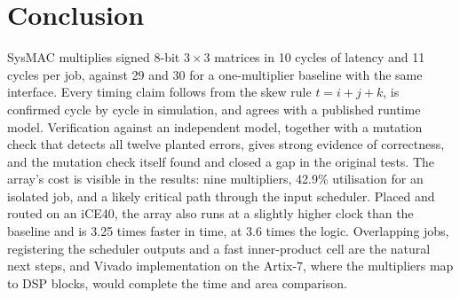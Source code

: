 \documentclass[conference]{IEEEtran}
\begin{document}
\section{Conclusion}
\label{sec:conc}
SysMAC multiplies signed 8-bit $3 \times 3$ matrices in 10 cycles of latency and 11 cycles per job, against 29 and 30 for a one-multiplier baseline with the same interface. Every timing claim follows from the skew rule $t = i + j + k$, is confirmed cycle by cycle in simulation, and agrees with a published runtime model. Verification against an independent model, together with a mutation check that detects all twelve planted errors, gives strong evidence of correctness, and the mutation check itself found and closed a gap in the original tests. The array's cost is visible in the results: nine multipliers, 42.9\% utilisation for an isolated job, and a likely critical path through the input scheduler. Placed and routed on an iCE40, the array also runs at a slightly higher clock than the baseline and is 3.25 times faster in time, at 3.6 times the logic. Overlapping jobs, registering the scheduler outputs and a fast inner-product cell are the natural next steps, and Vivado implementation on the Artix-7, where the multipliers map to DSP blocks, would complete the time and area comparison.
\end{document}
